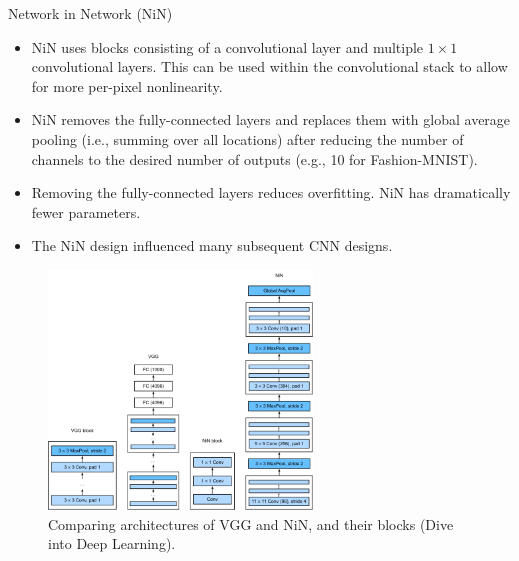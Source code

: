 \begin{vbframe}{Network in Network (NiN)}
  \begin{itemize}
    \item NiN uses blocks consisting of a convolutional layer and multiple $1 \times 1$ convolutional layers. This can be used within the convolutional stack to allow for more per-pixel nonlinearity.
    \item NiN removes the fully-connected layers and replaces them with global average pooling (i.e., summing over all locations) after reducing the number of channels to the desired number of outputs (e.g., 10 for Fashion-MNIST).
    \item Removing the fully-connected layers reduces overfitting. NiN has dramatically fewer parameters.
    \item The NiN design influenced many subsequent CNN designs.
  \end{itemize}
\framebreak
  \begin{figure}
  \centering
    \includegraphics[width=7cm]{plots/moderncnn/nin.png}
    \caption{Comparing architectures of VGG and NiN, and their blocks (Dive into Deep Learning).}
  \end{figure}

\end{vbframe}





